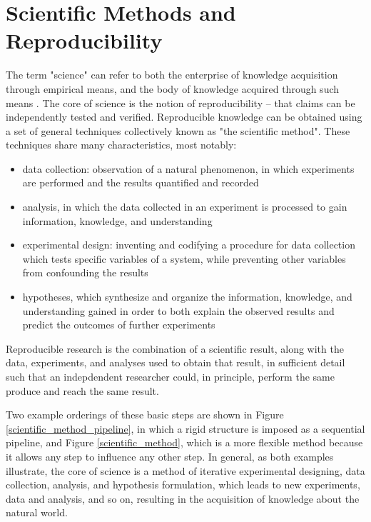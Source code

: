\section{Scientific Methods and Reproducibility}
The term "science" can refer to both the enterprise of knowledge acquisition 
through empirical means, and the body of knowledge acquired through such means 
\cite{drummond2012reproducible}.
The core of science is the notion of reproducibility 
\cite{russell2013reproducibility, nih2014reproducibility} -- that claims can be 
independently tested and verified.  Reproducible knowledge can be 
obtained using a set of general techniques collectively known as "the 
scientific method".  These techniques share many characteristics, most notably:
\begin{itemize}
 \item data collection: observation of a natural phenomenon, in which 
 experiments are performed and the results quantified and recorded
 \item analysis, in which the data collected in an experiment is processed to 
 gain information, knowledge, and understanding
 \item experimental design: inventing and codifying a procedure for data 
 collection which tests specific variables of a system, while preventing 
 other variables from confounding the results
 \item hypotheses, which synthesize and organize the information, knowledge, 
 and understanding gained in order to both explain the observed results and 
 predict the outcomes of further experiments
\end{itemize}

Reproducible research is the combination
of a scientific result, along with the data, experiments, and analyses used 
to obtain that result, in sufficient detail such that an indepdendent researcher
could, in principle, perform the same produce and reach the same result.

Two example orderings of these basic steps are shown in 
Figure \ref{scientific_method_pipeline}, in which a rigid structure is
imposed as a sequential pipeline, and Figure \ref{scientific_method}, which 
is a more flexible method because it allows any step to influence any other 
step.  In general, as both examples illustrate, the core of science is a
method of iterative experimental designing, data collection, analysis, and 
hypothesis formulation, which leads to new experiments, data and analysis,  
and so on, resulting in the acquisition of knowledge about the natural world.

